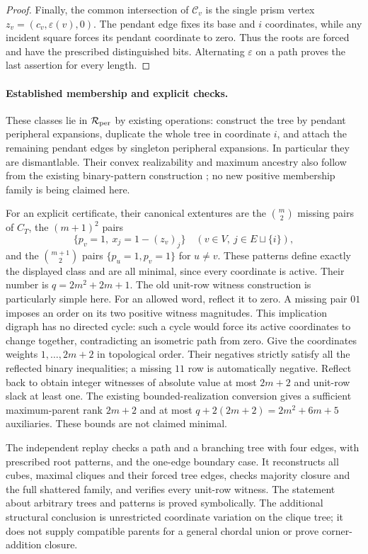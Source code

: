 \begin{proof}
Finally, the common intersection of $\mathcal C_v$ is the single
prism vertex $z_v=(c_v,\varepsilon(v),0)$. The pendant edge fixes
its base and $i$ coordinates, while any incident square forces its
pendant coordinate to zero. Thus the roots are forced and have the
prescribed distinguished bits. Alternating $\varepsilon$ on a path
proves the last assertion for every length.
\end{proof}

\paragraph{Established membership and explicit checks.}
These classes lie in $\mathcal R_{\rm per}$ by existing operations:
construct the tree by pendant peripheral expansions, duplicate the whole
tree in coordinate $i$, and attach the remaining pendant edges by
singleton peripheral expansions. In particular they are dismantlable.
Their convex realizability and maximum ancestry also follow from the
existing binary-pattern construction
\cite[Theorem~\texttt{thm:two-large-patterns}]{Methods}; no new positive
membership family is being claimed here.

For an explicit certificate, their canonical extentures are the
$\binom m2$ missing pairs of $C_T$, the $(m+1)^2$ pairs
\[
 \{p_v=1,\ x_j=1-(z_v)_j\}
 \quad(v\in V,\ j\in E\sqcup\{i\}),
\]
and the $\binom{m+1}{2}$ pairs $\{p_u=1,p_v=1\}$ for $u\ne v$.
These patterns define exactly the displayed class and are all minimal,
since every coordinate is active. Their number is $q=2m^2+2m+1$.
The old unit-row witness construction is particularly simple here.
For an allowed word, reflect it to zero. A missing pair $01$ imposes
an order on its two positive witness magnitudes. This implication digraph
has no directed cycle: such a cycle would force its active coordinates
to change together, contradicting an isometric path from zero.
Give the coordinates weights $1,\ldots,2m+2$ in topological order.
Their negatives strictly satisfy all the reflected binary inequalities;
a missing $11$ row is automatically negative. Reflect back to obtain
integer witnesses of absolute value at most $2m+2$ and unit-row slack
at least one. The existing bounded-realization conversion gives a
sufficient maximum-parent rank $2m+2$ and at most
$q+2(2m+2)=2m^2+6m+5$ auxiliaries. These bounds are not claimed minimal.

The independent replay checks a path and a branching tree with four
edges, with prescribed root patterns, and the one-edge boundary case.
It reconstructs all cubes, maximal cliques and their forced tree edges,
checks majority closure and the full shattered family, and verifies every
unit-row witness. The statement about arbitrary trees and patterns is
proved symbolically. The additional structural conclusion is unrestricted
coordinate variation on the clique tree; it does not supply compatible
parents for a general chordal union or prove corner-addition closure.
